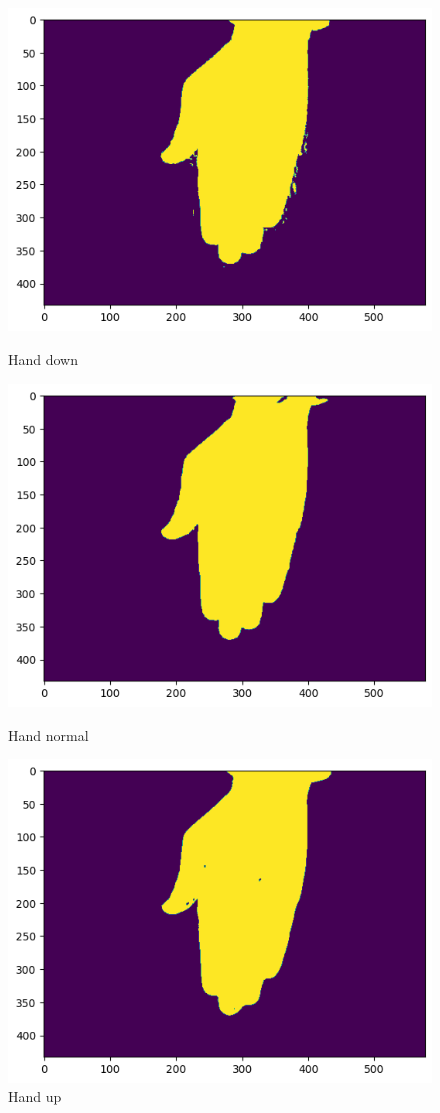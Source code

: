 \documentclass{report}
\begin{document}
\begin{figure}[H]
    \includegraphics[width=\linewidth]{Images/hand_downYCRCB.png}
    \caption{Hand down}
  \endminipage\hfill
    \includegraphics[width=\linewidth]{Images/hand_normalYCRCB.png}
    \caption{Hand normal}
  \endminipage\hfill
    \includegraphics[width=\linewidth]{Images/hand_upYCRCB.png}
    \caption{Hand up}
  \endminipage\hfill
\end{figure}
\end{document}
